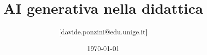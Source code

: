 

\title{AI generativa nella didattica}

\author[Davide Ponzini]{
    [davide.ponzini@edu.unige.it]
}


\date[\the\year]{\today}

